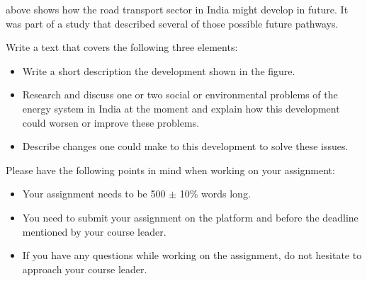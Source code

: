  above shows how the road transport sector in India might develop in future. It was part of a study that described several of those possible future pathways.

Write a text that covers the following three elements:
\begin{itemize}
\item Write a short description the development shown in the figure.
\item Research and discuss one or two social or environmental problems of the energy system in India at the moment and explain how this development could worsen or improve these problems.
\item Describe changes one could make to this development to solve these issues.
\end{itemize}


Please have the following points in mind when working on your assignment:

\begin{itemize}
\item Your assignment needs to be 500 $\pm$ 10\% words long.
\item You need to submit your assignment on the platform and before the deadline mentioned by your course leader.
\item If you have any questions while working on the assignment, do not hesitate to approach your course leader.
\end{itemize}
